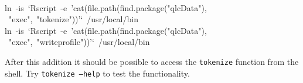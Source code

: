 \documentclass[output=inprep,
		biblatex
		]{LSP/langsci}\usepackage[]{graphicx}\usepackage[]{color}
\makeatletter
\newcommand{\hlstr}[1]{\textcolor[rgb]{0.192,0.494,0.8}{#1}}%
\newcommand{\hlopt}[1]{\textcolor[rgb]{0,0,0}{#1}}%
\newcommand{\hlstd}[1]{\textcolor[rgb]{0.345,0.345,0.345}{#1}}%
\newcommand{\hlkwb}[1]{\textcolor[rgb]{0.69,0.353,0.396}{#1}}%
\newcommand{\hlkwc}[1]{\textcolor[rgb]{0.333,0.667,0.333}{#1}}%
\newenvironment{kframe}{%
 \def\at@end@of@kframe{}%
 \ifinner\ifhmode%
  \def\at@end@of@kframe{\end{minipage}}%
  \begin{minipage}{\columnwidth}%
 \fi\fi%
 \def\FrameCommand##1{\hskip\@totalleftmargin \hskip-\fboxsep
 \colorbox{shadecolor}{##1}\hskip-\fboxsep
     \hskip-\linewidth \hskip-\@totalleftmargin \hskip\columnwidth}%
 \MakeFramed {\advance\hsize-\width
   \@totalleftmargin\z@ \linewidth\hsize
   \@setminipage}}%
 {\par\unskip\endMakeFramed%
 \at@end@of@kframe}
\newenvironment{knitrout}{}{} %
\makeatother
\begin{document}
\begin{knitrout}\scriptsize
{}\color{fgcolor}\begin{kframe}
\noindent
\ttfamily
\hlstd{}\hspace*{\fill}\\
\hlstd{}\hlkwc{ln\ }\hlstd{}\hlopt{{-}}\hlstd{is\ }\hlstr{`Rscript\ {-}e\ 'cat(file.path(find.package("qlcData"),}\hspace*{\fill}\\
\hlstr{\ "exec",\ "tokenize"))'`}\hlstd{\ }\hlopt{/}\hlstd{usr}\hlopt{/}\hlstd{}\hlkwb{local}\hlstd{}\hlopt{/}\hlstd{bin}\hspace*{\fill}\\
\hlkwc{ln\ }\hlstd{}\hlopt{{-}}\hlstd{is\ }\hlstr{`Rscript\ {-}e\ 'cat(file.path(find.package("qlcData"),}\hspace*{\fill}\\
\hlstr{\ "exec",\ "writeprofile"))'`}\hlstd{\ }\hlopt{/}\hlstd{usr}\hlopt{/}\hlstd{}\hlkwb{local}\hlstd{}\hlopt{/}\hlstd{bin}\hspace*{\fill}
\mbox{}
\normalfont
\end{kframe}
\end{knitrout}

\noindent After this addition it should be possible to access the \texttt{tokenize}
function from the shell. Try \texttt{tokenize --help} to test the functionality.
\end{document}
